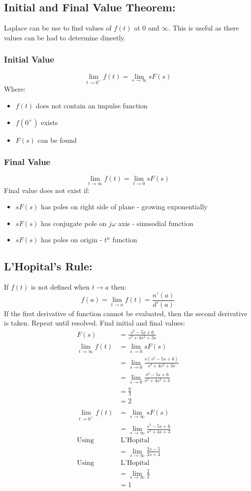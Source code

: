 \documentclass[a5paper]{article}
\begin{document}
	\subsection{Initial and Final Value Theorem:}
	Laplace can be use to find values of $f(t)$ at $0$ and $\infty$. This is useful as there values can be had to determine dineetly.
	\subsubsection{Initial Value}
	$$\lim_{t\to0^{+}}f(t)=\lim_{s\to\infty}sF(s)$$
	Where:
	\begin{itemize}
		\item $f(t)$ does not contain an impulse function
		\item $f(0^{+})$ exists
		\item $F(s)$ can be found
	\end{itemize}
	\subsubsection{Final Value}
	$$\lim_{t\to\infty}f(t)=\lim_{t\to0}sF(s)$$
	Final value does not exist if:
	\begin{itemize}
		\item $sF(s)$ has poles on right side of plane - growing exponentially
		\item $sF(s)$ has conjugate pole on $j\omega$ axis - sinusodial function
		\item $sF(s)$ has poles on origin - $t^{n}$ function
	\end{itemize}
	\subsection{L'Hopital's Rule:}
	If $f(t)$ is not defined when $t\to a$ then:
	$$f(a)=\lim_{t\to a}f(t)=\frac{n'(a)}{d'(a)}$$
	If the first derivative of function cannot be evaluated, then the second derivative is taken. Repeat until resolved. Find initial and final values:
	\begin{align*}
		F(s)&=\frac{s^{2}-5s+6}{s^{3}+4s^{2}+3s}\\
		\lim_{t\to\infty}f(t)&=\lim_{s\to0}sF(s)\\
		&=\lim_{s\to0}\frac{s(s^{2}-5s+6)}{s^{3}+4s^{2}+3s}\\
		&=\lim_{s\to0}\frac{s^{2}-5s+6}{s^{2}+4s^{2}+3}\\
		&=\frac{6}{3}\\
		&=2\\\\
		\lim_{t\to0^{+}}f(t)&=\lim_{s\to\infty}sF(s)\\
		&=\lim_{s\to\infty}\frac{s^{2}-5s+6}{s^{2}+4s+3}\\
		\text{Using}&\;\text{L'Hopital}\\
		&=\lim_{s\to\infty}\frac{2s-5}{2s+4}\\
		\text{Using}&\;\text{L'Hopital}\\
		&=\lim_{s\to\infty}\frac{2}{2}\\
		&=1
	\end{align*}
\end{document}
